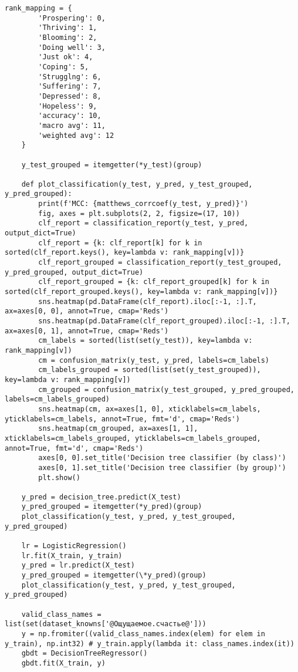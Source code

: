 \begin{lstlisting}[label=lst:1,caption=Классификация с использованием дерева решений\, логистической регрессии и ансамблевого классификатора]
	rank_mapping = {
		'Prospering': 0,
		'Thriving': 1,
		'Blooming': 2,
		'Doing well': 3,
		'Just ok': 4,
		'Coping': 5,
		'Strugglng': 6,
		'Suffering': 7,
		'Depressed': 8,
		'Hopeless': 9,
		'accuracy': 10,
		'macro avg': 11,
		'weighted avg': 12
	}
	
	y_test_grouped = itemgetter(*y_test)(group)
	
	def plot_classification(y_test, y_pred, y_test_grouped, y_pred_grouped):
		print(f'MCC: {matthews_corrcoef(y_test, y_pred)}')
		fig, axes = plt.subplots(2, 2, figsize=(17, 10))
		clf_report = classification_report(y_test, y_pred, output_dict=True)
		clf_report = {k: clf_report[k] for k in sorted(clf_report.keys(), key=lambda v: rank_mapping[v])}
		clf_report_grouped = classification_report(y_test_grouped, y_pred_grouped, output_dict=True)
		clf_report_grouped = {k: clf_report_grouped[k] for k in sorted(clf_report_grouped.keys(), key=lambda v: rank_mapping[v])}
		sns.heatmap(pd.DataFrame(clf_report).iloc[:-1, :].T, ax=axes[0, 0], annot=True, cmap='Reds')
		sns.heatmap(pd.DataFrame(clf_report_grouped).iloc[:-1, :].T, ax=axes[0, 1], annot=True, cmap='Reds')
		cm_labels = sorted(list(set(y_test)), key=lambda v: rank_mapping[v])
		cm = confusion_matrix(y_test, y_pred, labels=cm_labels)
		cm_labels_grouped = sorted(list(set(y_test_grouped)), key=lambda v: rank_mapping[v])
		cm_grouped = confusion_matrix(y_test_grouped, y_pred_grouped, labels=cm_labels_grouped)
		sns.heatmap(cm, ax=axes[1, 0], xticklabels=cm_labels, yticklabels=cm_labels, annot=True, fmt='d', cmap='Reds')
		sns.heatmap(cm_grouped, ax=axes[1, 1], xticklabels=cm_labels_grouped, yticklabels=cm_labels_grouped, annot=True, fmt='d', cmap='Reds')
		axes[0, 0].set_title('Decision tree classifier (by class)')
		axes[0, 1].set_title('Decision tree classifier (by group)')
		plt.show()
	
	y_pred = decision_tree.predict(X_test)
	y_pred_grouped = itemgetter(*y_pred)(group)
	plot_classification(y_test, y_pred, y_test_grouped, y_pred_grouped)
	
	lr = LogisticRegression()
	lr.fit(X_train, y_train)
	y_pred = lr.predict(X_test)
	y_pred_grouped = itemgetter(\*y_pred)(group)
	plot_classification(y_test, y_pred, y_test_grouped, y_pred_grouped)
	
	valid_class_names = list(set(dataset_knowns['@Ощущаемое.счастье@']))
	y = np.fromiter((valid_class_names.index(elem) for elem in y_train), np.int32) # y_train.apply(lambda it: class_names.index(it))
	gbdt = DecisionTreeRegressor()
	gbdt.fit(X_train, y)
	

\end{lstlisting}
